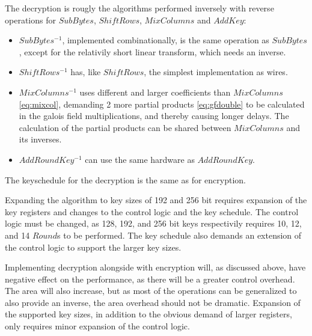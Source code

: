 The decryption is rougly the algorithms performed inversely with
reverse operations for $SubBytes$, $ShiftRows$, $MixColumns$ and
$AddKey$: 
\begin{itemize}
  \item $SubBytes^{-1}$, implemented combinationally, is the same
    operation as $SubBytes$, except for the relativily short linear
    transform, which needs an inverse. 
  \item $ShiftRows^{-1}$ has, like $ShiftRows$, the simplest
    implementation as wires. 
  \item $MixColumns^{-1}$ uses different and larger coefficients
    than $MixColumns$ \eqref{eq:mixcol}, demanding 2 more partial
    products \eqref{eq:gfdouble} to be calculated in the
    galois field multiplications, and thereby causing longer
    delays. The calculation of the partial products can be shared
    between $MixColumns$ and its inverses. 
  \item $AddRoundKey^{-1}$ can use the same hardware as
    $AddRoundKey$. 
\end{itemize}
The keyschedule for the decryption is the same as for encryption.

Expanding the algorithm to key sizes of 192 and 256 bit requires
expansion of the key registers and changes to the control logic and
the key schedule. The control logic must be changed, as 128, 192, and
256 bit keys respectivily requires 10, 12, and 14 $Round$s to be
performed. The key schedule also demands an extension of the control
logic to support the larger key sizes.

Implementing decryption alongside with encryption will, as discussed
above, have negative effect on the performance, as there will be a
greater control overhead. The area will also increase, but as most of
the operations can be generalized to also provide an inverse, the area
overhead should not be dramatic. Expansion of the supported key sizes,
in addition to the obvious demand of larger registers, only requires
minor expansion of the control logic.


